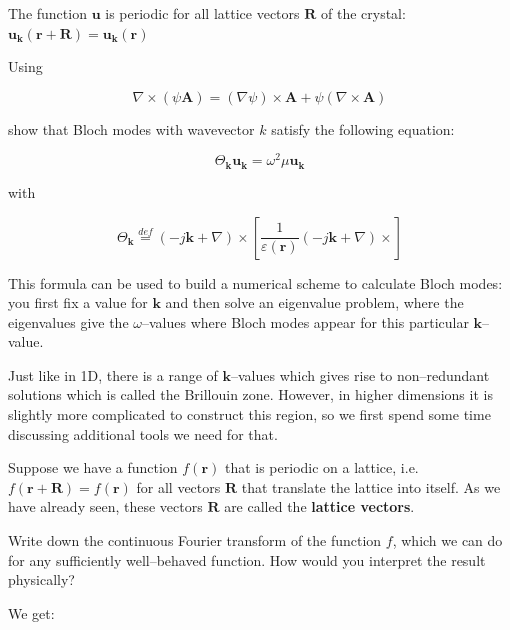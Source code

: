 The function ${\mathbf u}$ is periodic for all lattice vectors ${\mathbf R}$ of the crystal: ${\mathbf u}_{\mathbf k} ({\mathbf r} + {\mathbf R})  = {\mathbf u}_{\mathbf k} ({\mathbf r})$


\begin{exer}

Using

$$ \nabla \times (\psi {\mathbf A}) = (\nabla \psi) \times {\mathbf A} + \psi (\nabla \times {\mathbf A}) $$
  
show that Bloch modes with wavevector $k$ satisfy the following equation:

$$\Theta_{\mathbf k} {\mathbf u}_{\mathbf k} = \omega^2 \mu {\mathbf u}_{\mathbf k}$$

with

$$\Theta_{\mathbf k} \stackrel{def}{=} (-j {\mathbf k} + \nabla) \times \left [ \frac{1}{\varepsilon({\mathbf r})}(-j{\mathbf k} +\nabla) \times \right ]$$

This formula can be used to build a numerical scheme to calculate Bloch modes: you first fix a value for ${\mathbf k}$ and then solve an eigenvalue problem, where the eigenvalues give the $\omega$--values where Bloch modes appear for this particular ${\mathbf k}$--value.

\end{exer}

Just like in 1D, there is a range of ${\mathbf k}$--values which gives rise to non--redundant solutions which is called the Brillouin zone. However, in higher dimensions it is slightly more complicated to construct this region, so we first spend some time discussing additional tools we need for that.

\pagebreak


Suppose we have a function $f({\mathbf r})$ that is periodic on a lattice, i.e. $f({\mathbf r} + {\mathbf R}) = f({\mathbf r})$ for all vectors ${\mathbf R}$ that translate the lattice into itself. As we have already seen, these vectors ${\mathbf R}$ are called the \textbf{lattice vectors}.

\begin{cue}
  Write down the continuous Fourier transform of the function $f$, which we can do for any sufficiently well--behaved function. How would you interpret the result physically?
\end{cue}

We get:

